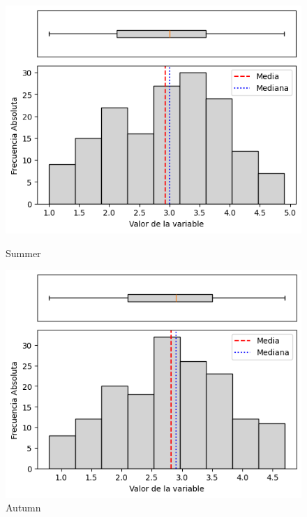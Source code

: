 \begin{figure}[H]
\centering
\begin{minipage}{0.30\textwidth}
  \includegraphics[width=\linewidth]{resultados/por_estacion_del_anio/boxplot_clases_por_estacion/Ancachuro/WS_HistBoxplot_Summer.png}
  \caption*{Summer}
\end{minipage}
\hfill
\begin{minipage}{0.30\textwidth}
  \includegraphics[width=\linewidth]{resultados/por_estacion_del_anio/boxplot_clases_por_estacion/Ancachuro/WS_HistBoxplot_Autumn.png}
  \caption*{Autumn}
\end{minipage}

\vspace{0.2cm}


\end{figure}
